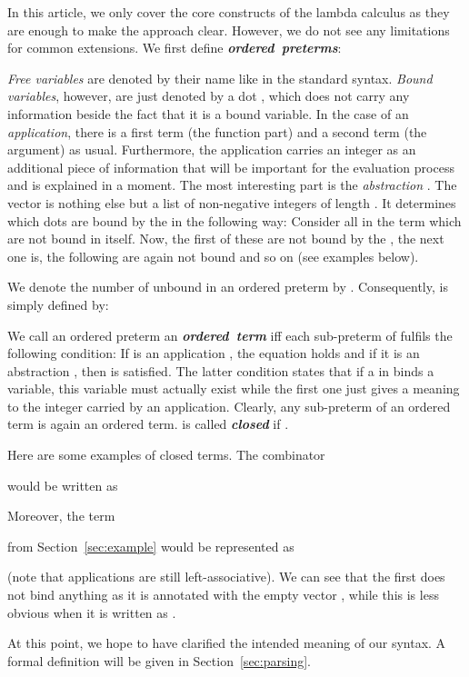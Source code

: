 \documentclass[submission,copyright,creativecommons]{eptcs}
\newcommand{\define}[1]{\mbox{\textbf{\textit{#1}}}}
\begin{document}
In this article, we only cover the core constructs of the lambda calculus as they are enough to make the approach clear. However, we do not see any limitations for common extensions. We first define \define{ordered preterms}:

\emph{Free variables} are denoted by their name like in the standard syntax. \emph{Bound variables}, however, are just denoted by a dot , which does not carry any information beside the fact that it is a bound variable. 
In the case of an \emph{application}, there is a first term (the function part) and a second term (the argument) as usual. 
Furthermore, the application carries an integer  as an additional piece of information that will be important for the evaluation process and is explained 
in a moment.
The most interesting part is the \emph{abstraction} . The vector  is nothing else but a list of non-negative  integers of length . It determines which dots  are bound by the  in the following way: Consider all  in the term  which are not bound in  itself. Now, the first  of these are not bound by the , the next one is, the following  are again not bound and so on (see examples below). 

We denote the number of unbound  in an ordered preterm  by . Consequently,  is simply defined by: 

We call an ordered preterm  an \define{ordered term} iff each sub-preterm  of  fulfils the following condition: If  is an application , the equation  holds and if it is an abstraction , then  is satisfied. The latter condition states that if a  in  binds a variable, this variable must actually exist while the first one just gives a meaning to the integer carried by an application. Clearly, any sub-preterm of an ordered term is again an ordered term. 
 is called \define{closed} if .


Here are some examples of closed terms.
The  combinator 

would be written as 

Moreover, the term 

from Section~\ref{sec:example} would be represented as

(note that applications are still left-associative). We can see that the first  does not bind anything as it is annotated with the empty vector , while this is less obvious when it is written as . 

At this point, we hope to have clarified the intended meaning of our syntax. A formal definition will be given in Section~\ref{sec:parsing}.
\end{document}
